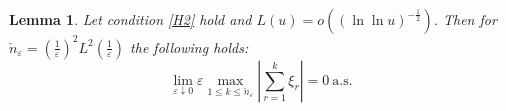 \documentclass{article}
\theoremstyle{plain}
\newtheorem{lemma}[theorem]{Lemma}
\theoremstyle{definition}
\theoremstyle{remark}
\newcommand{\ra }{ \rightarrow} %
\newcommand{\beq}{\begin{equation}}
\newcommand{\eeq}{\end{equation}}
\begin{document}



\begin{lemma} \label{l.02} Let condition \ref{H2} hold and $L(u) = o\left( (\ln \ln u)^{-\frac{1}{2}}\right)$. 
Then for
$\check{n}_\varepsilon=\left(\frac{1}{\varepsilon}\right)^2L^2\left(\frac{1}{\varepsilon}\right)$ the following holds:
$$
\lim\limits_{\varepsilon\downarrow 0}
\varepsilon\max\limits_{1\leqslant k \leqslant \check{n}_\varepsilon}\left|\sum\limits_{r=1}^k\xi_r\right|=0 \ \text{a.s.}
$$
\end{lemma}
\end{document}
